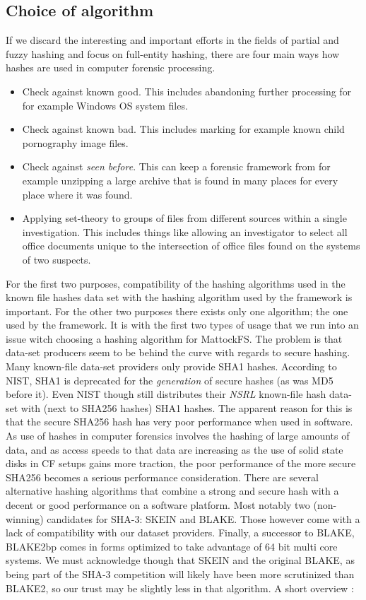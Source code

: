 \subsection{Choice of algorithm}
If we discard the interesting and important efforts in the fields of partial and fuzzy hashing and focus on full-entity hashing, there are four main ways how hashes are used in computer forensic processing.
\begin{itemize}
\item Check against known good. This includes abandoning further processing for for example Windows OS system files.
\item Check against known bad. This includes marking for example known child pornography image files.
\item Check against \emph{seen before}. This can keep a forensic framework from for example unzipping a large archive that is found in many places for every place where it was found.
\item Applying set-theory to groups of files from different sources within a single investigation. This includes things like allowing an investigator to select all office documents unique to the intersection of office files found on the systems of two suspects.
\end{itemize} 
For the first two purposes, compatibility of the hashing algorithms used in the known file hashes data set with the hashing algorithm used by the framework is important. For the other two purposes there exists only one algorithm; the one used by the framework. It is with the first two types of usage that we run into an issue witch choosing a hashing algorithm for MattockFS. The problem is that data-set producers seem to be behind the curve with regards to secure hashing. Many known-file data-set providers only provide SHA1 hashes. According to NIST, SHA1 is deprecated for the \emph{generation} of secure hashes (as was MD5 before it). Even NIST though still distributes their \emph{NSRL} known-file hash data-set with (next to SHA256 hashes) SHA1 hashes.  The apparent reason for this is that the secure SHA256 hash has very poor performance when used in software. As use of hashes in computer forensics involves the hashing of large amounts of data, and as access speeds to that data are increasing as the use of solid state disks in CF setups gains more traction, the poor performance of the more secure SHA256 becomes a serious performance consideration. There are several alternative hashing algorithms that combine a strong and secure hash with a decent or good performance on a software platform. Most notably two (non-winning) candidates for SHA-3: SKEIN and BLAKE. Those however come with a lack of compatibility with our dataset providers. Finally, a successor to BLAKE, BLAKE2bp comes in forms optimized to take advantage of 64 bit multi core systems. We must acknowledge though that SKEIN and the original BLAKE, as being part of the SHA-3 competition will likely have been more scrutinized than BLAKE2, so our trust may be slightly less in that algorithm. A short overview :
